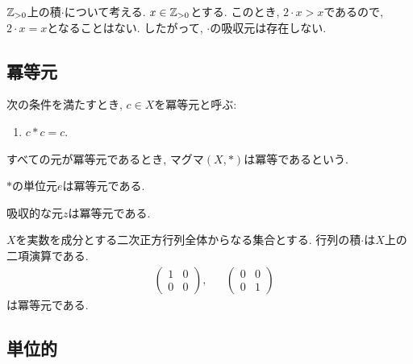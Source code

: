 \begin{nonexample}
  $\mathbb{Z}_{>0}$上の積$\cdot$について考える.
  $x\in\mathbb{Z}_{>0}$とする.
  このとき, $2\cdot x>x$であるので,
  $2\cdot x=x$となることはない.
  したがって, $\cdot$の吸収元は存在しない.
\end{nonexample}


\subsection{冪等元}
\begin{definition}
    次の条件を満たすとき,
    $c\in X$を冪等元と呼ぶ:
    \begin{enumerate}
    \item $c\ast c=c$.
    \end{enumerate}
    すべての元が冪等元であるとき,
    マグマ$(X,\ast)$は冪等であるという.
\end{definition}

\begin{example}
  $\ast$の単位元$e$は冪等元である.
\end{example}
\begin{example}
  吸収的な元$z$は冪等元である.
\end{example}
\begin{example}
  $X$を実数を成分とする二次正方行列全体からなる集合とする.
  行列の積$\cdot$は$X$上の二項演算である.
  \begin{align*}
    &\begin{pmatrix}1&0\\0&0\end{pmatrix},
     & &\begin{pmatrix}0&0\\0&1\end{pmatrix}
  \end{align*}
  は冪等元である.
\end{example}

\subsection{単位的}
